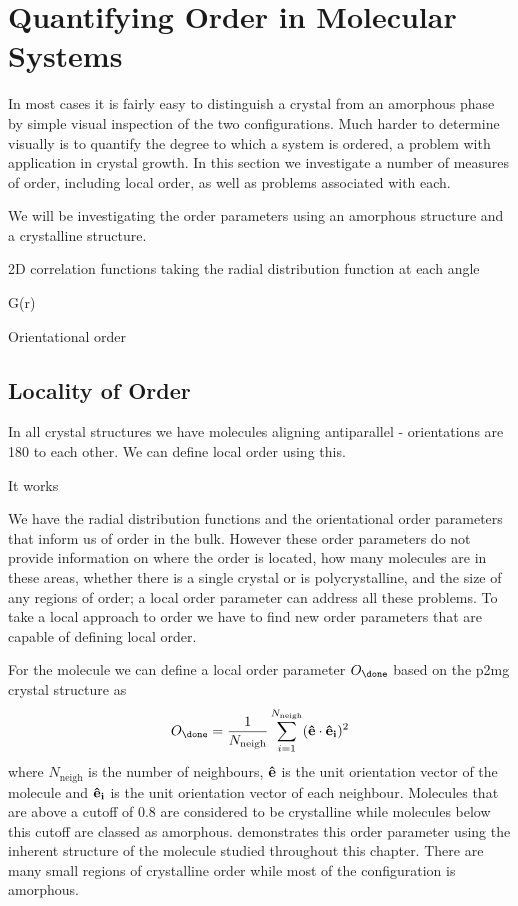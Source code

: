 \section{Quantifying Order in Molecular Systems}

In most cases it is fairly easy to distinguish a crystal from an amorphous phase by simple visual inspection of the two configurations. Much harder to determine visually is to quantify the degree to which a system is ordered, a problem with application in crystal growth. In this section we investigate a number of measures of order, including local order, as well as problems associated with each.

We will be investigating the order parameters using an amorphous \scon structure and a crystalline \scon structure.

2D correlation functions taking the radial distribution function at each angle

G(r)

Orientational order


\subsection{Locality of Order}

In all crystal structures we have molecules aligning antiparallel - orientations are 180 to each other. We can define local order using this.

It works



We have the radial distribution functions and the orientational order parameters that inform us of order in the bulk. However these order parameters do not provide information on where the order is located, how many molecules are in these areas, whether there is a single crystal or is polycrystalline, and the size of any regions of order; a local order parameter can address all these problems. To take a local approach to order we have to find new order parameters that are capable of defining local order.

For the \done molecule we can define a local order parameter $O_\done$ based on the p2mg crystal structure as
\begin{equation}
    O_{\done} = \frac{1}{N_{\text{neigh}}}\sum_{i=1}^{N_\text{neigh}} (\vect{\hat e} \cdot \vect{\hat e_i})^2
\end{equation}
where $N_\text{neigh}$ is the number of neighbours, $\mathbf{\hat e}$ is the unit orientation vector of the molecule and $\mathbf{\hat e_i}$ is the unit orientation vector of each neighbour. Molecules that are above a cutoff of $0.8$ are considered to be crystalline while molecules below this cutoff are classed as amorphous.  demonstrates this order parameter using the inherent structure of the \done molecule studied throughout this chapter. There are many small regions of crystalline order while most of the configuration is amorphous.

